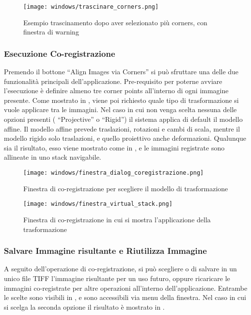 \begin{figure}[H]
    \centering
    \texttt{[image: windows/trascinare\_corners.png]}
    \caption{Esempio trascinamento dopo aver selezionato più corners, con finestra di warning}
    \label{fig:19}
\end{figure}

\subsubsection{Esecuzione Co-registrazione}
\noindent Premendo il bottone ``Align Images via Corners'' si può sfruttare una delle due funzionalità principali dell'applicazione. Pre-requisito per poterne avviare l'esecuzione è definire almeno tre corner points all'interno di ogni immagine presente. Come mostrato in , viene poi richiesto quale tipo di trasformazione si vuole applicare tra le immagini. Nel caso in cui non venga scelta nessuna delle opzioni presenti ( ``Projective'' o ``Rigid'') il sistema applica di default il modello affine. Il modello affine prevede traslazioni, rotazioni e cambi di scala, mentre il modello rigido solo traslazioni, e quello proiettivo anche deformazioni. Qualunque sia il risultato, esso viene mostrato come in , e le immagini registrate sono allineate in uno stack navigabile.

\begin{figure}[H]
    \centering
    \texttt{[image: windows/finestra\_dialog\_coregistrazione.png]}
    \caption{Finestra di co-registrazione per scegliere il modello di trasformazione}
    \label{fig:20}
\end{figure}

\begin{figure}[H]
    \centering
    \texttt{[image: windows/finestra\_virtual\_stack.png]}
    \caption{Finestra di co-registrazione in cui si mostra l'applicazione della trasformazione}
    \label{fig:21}
\end{figure}

\subsubsection{Salvare Immagine risultante e Riutilizza Immagine}
\noindent A seguito dell'operazione di co-registrazione, si può scegliere o di salvare in un unico file TIFF l'immagine risultante per un uso futuro, oppure ricaricare le immagini co-registrate per altre operazioni all'interno dell'applicazione. Entrambe le scelte sono visibili in , e sono accessibili via menu della finestra. Nel caso in cui si scelga la seconda opzione il risultato è mostrato in .


